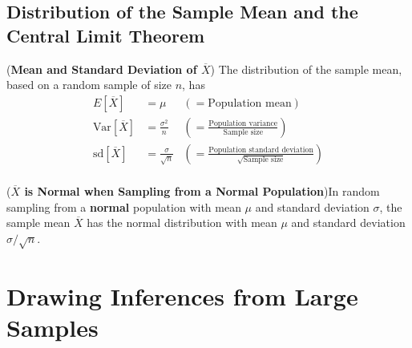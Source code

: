 \documentclass[12pt,openany]{book}
\theoremstyle{definition}
\newcommand{\Var}{\text{Var}}
\newcommand{\sd}{\text{sd}}
\begin{document}
	\subsection{Distribution of the Sample Mean and the Central Limit Theorem}
	
	\begin{tcolorbox}[colback=white]
		(\textbf{Mean and Standard Deviation of $\overline{X}$}) The distribution of the sample mean, based on a random sample of size $n$, has \begin{align*}
			E[\overline{X}] &=\mu&(=\text{Population mean}) \\
			\Var[\overline{X}] &=\frac{\sigma^2}{n}&\left(=\frac{\text{Population variance}}{\text{Sample size}}\right) \\
			\sd[\overline{X}] &=\frac{\sigma}{\sqrt{n}}&\left(=\frac{\text{Population standard deviation}}{\sqrt{\text{Sample size}}}\right) \\
		\end{align*}
	\end{tcolorbox}
	
	\begin{tcolorbox}[colback=white]
		(\textbf{$\overline{X}$ is Normal when Sampling from a Normal Population})\quad In random sampling from a \textbf{normal} population with mean $\mu$ and standard deviation $\sigma$, the sample mean $\overline{X}$ has the normal distribution with mean $\mu$ and standard deviation $\sigma/\sqrt{n}$.
	\end{tcolorbox}
	
	\newpage
	\section{Drawing Inferences from Large Samples}
	
\end{document}
